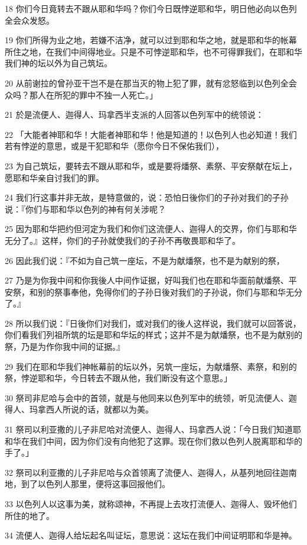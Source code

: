 \par 18 你们今日竟转去不跟从耶和华吗？你们今日既悖逆耶和华，明日他必向以色列全会众发怒。
\par 19 你们所得为业之地，若嫌不洁净，就可以过到耶和华之地，就是耶和华的帐幕所住之地，在我们中间得地业。只是不可悖逆耶和华，也不可得罪我们，在耶和华我们神的坛以外为自己筑坛。
\par 20 从前谢拉的曾孙亚干岂不是在那当灭的物上犯了罪，就有忿怒临到以色列全会众吗？那人在所犯的罪中不独一人死亡。」
\par 21 於是流便人、迦得人、玛拿西半支派的人回答以色列军中的统领说：
\par 22 「大能者神耶和华！大能者神耶和华！他是知道的！以色列人也必知道！我们若有悖逆的意思，或是干犯耶和华（愿你今日不保佑我们），
\par 23 为自己筑坛，要转去不跟从耶和华，或是要将燔祭、素祭、平安祭献在坛上，愿耶和华亲自讨我们的罪。
\par 24 我们行这事并非无故，是特意做的，说：恐怕日後你们的子孙对我们的子孙说：『你们与耶和华以色列的神有何关涉呢？
\par 25 因为耶和华把约但河定为我们和你们这流便人、迦得人的交界，你们与耶和华无分了。』这样，你们的子孙就使我们的子孙不再敬畏耶和华了。
\par 26 因此我们说：『不如为自己筑一座坛，不是为献燔祭，也不是为献别的祭，
\par 27 乃是为你我中间和你我後人中间作证据，好叫我们也在耶和华面前献燔祭、平安祭，和别的祭事奉他，免得你们的子孙日後对我们的子孙说，你们与耶和华无分了。』
\par 28 所以我们说：『日後你们对我们，或对我们的後人这样说，我们就可以回答说，你们看我们列祖所筑的坛是耶和华坛的样式；这并不是为献燔祭，也不是为献别的祭，乃是为作你我中间的证据。』
\par 29 我们在耶和华我们神帐幕前的坛以外，另筑一座坛，为献燔祭、素祭，和别的祭，悖逆耶和华，今日转去不跟从他，我们断没有这个意思。」
\par 30 祭司非尼哈与会中的首领，就是与他同来以色列军中的统领，听见流便人、迦得人、玛拿西人所说的话，就都以为美。
\par 31 祭司以利亚撒的儿子非尼哈对流便人、迦得人、玛拿西人说：「今日我们知道耶和华在我们中间，因为你们没有向他犯了这罪。现在你们救以色列人脱离耶和华的手了。」
\par 32 祭司以利亚撒的儿子非尼哈与众首领离了流便人、迦得人，从基列地回往迦南地，到了以色列人那里，便将这事回报他们。
\par 33 以色列人以这事为美，就称颂神，不再提上去攻打流便人、迦得人、毁坏他们所住的地了。
\par 34 流便人、迦得人给坛起名叫证坛，意思说：这坛在我们中间证明耶和华是神。

